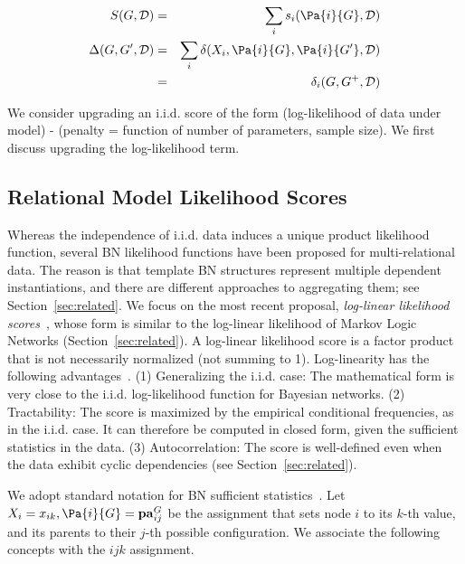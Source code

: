 \documentclass[letterpaper]{article}
\begin{document}
\begin{eqnarray}
\label{eq:decompose} \Score{S}{\graph}{\dstructure}&=&\sum_{i} \score{s}{i}{\Pa{i}{\graph}}{\dstructure} \\
\Gain{\Delta}{\graph}{\graph'}{\dstructure}&=& 
\sum_{i} \delta(\node_{i},\Pa{i}{\graph},\Pa{i}{\graph'},\dstructure)  \label{eq:decompose-gain}
\\& = & \gain{\delta}{i}{\graph}{\dstructure} \label{eq:gain-short}
\end{eqnarray}


We consider upgrading an i.i.d. score of the form
(log-likelihood of data under model) - (penalty = function of number of parameters, sample size). We first discuss upgrading the log-likelihood term.

\subsection{Relational Model Likelihood Scores}

Whereas the independence of i.i.d. data induces a unique product likelihood function, several BN likelihood functions have been proposed for multi-relational data. The reason is that template BN structures represent multiple dependent instantiations, and there are different approaches to aggregating them; see Section~\ref{sec:related}. We focus on the most recent proposal, {\em log-linear likelihood scores}~\cite{Schulte2011}, whose form is similar to the log-linear likelihood of Markov Logic Networks (Section~\ref{sec:related}). A log-linear likelihood score is a factor product  that is not necessarily normalized (not summing to 1). Log-linearity has the following advantages~\cite{Schulte2011}. (1) Generalizing the i.i.d. case: The mathematical form is very close to the  i.i.d. log-likelihood function for Bayesian networks. (2) Tractability: The score is maximized by the empirical conditional frequencies, as in the i.i.d. case. It can therefore be computed in closed form, given the sufficient statistics in the data. (3) Autocorrelation: The score is well-defined even when the data exhibit cyclic dependencies (see Section~\ref{sec:related}). 


We adopt standard notation for BN sufficient statistics~\cite{Heckerman1998}. Let $\node_{i} = \xvalue_{ik},\Pa{i}{\graph}=\pavalue{ij}{\graph}$ be the assignment that sets node $i$ to its $k$-th value, and its parents to their $j$-th possible configuration. We associate the following concepts with the $ijk$ assignment.
\end{document}

